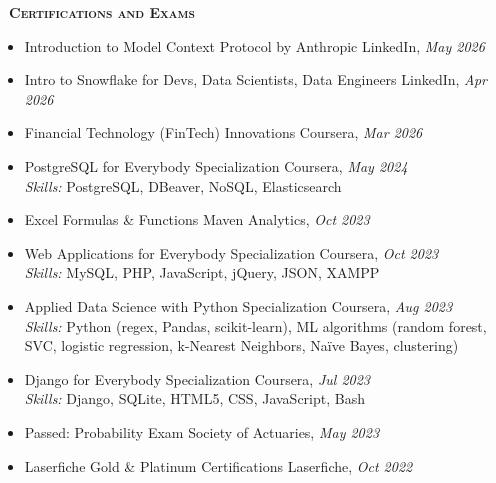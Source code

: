 \documentclass[a4paper,11pt]{article}
\newcommand{\header} [1] {
    {\textsc{\textbf{\Large{\xrfill[0.5ex]{0.5pt}~#1~\xrfill[0.5ex]{0.5pt}}}}}
}
\begin{document}
\vspace{2mm}
\header{Certifications and Exams}
\vspace{1mm}

\begin{itemize}
\item Introduction to Model Context Protocol by Anthropic \hfill LinkedIn, \textit{May 2026}
\item Intro to Snowflake for Devs, Data Scientists, Data Engineers \hfill LinkedIn, \textit{Apr 2026}
\item Financial Technology (FinTech) Innovations \hfill Coursera, \textit{Mar 2026}
\item PostgreSQL for Everybody Specialization \hfill Coursera, \textit{May 2024}\\
\textit{Skills:} PostgreSQL, DBeaver, NoSQL, Elasticsearch
\item Excel Formulas \& Functions \hfill Maven Analytics, \textit{Oct 2023}
\item Web Applications for Everybody Specialization \hfill Coursera, \textit{Oct 2023}\\
\textit{Skills:} MySQL, PHP, JavaScript, jQuery, JSON, XAMPP
\item Applied Data Science with Python Specialization \hfill Coursera, \textit{Aug 2023}\\
\textit{Skills:} Python (regex, Pandas, scikit-learn), ML algorithms (random forest, SVC, logistic regression, k-Nearest Neighbors, Na\"{i}ve Bayes, clustering)
\item Django for Everybody Specialization \hfill Coursera, \textit{Jul 2023}\\
\textit{Skills:} Django, SQLite, HTML5, CSS, JavaScript, Bash
\item Passed: Probability Exam \hfill Society of Actuaries, \textit{May 2023}
\item Laserfiche Gold \& Platinum Certifications \hfill Laserfiche, \textit{Oct 2022}
\end{itemize}
\end{document}
